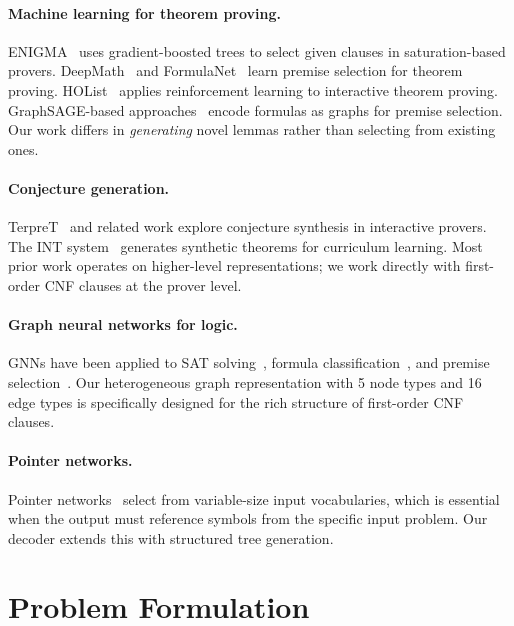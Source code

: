 \documentclass{article}
\begin{document}
\paragraph{Machine learning for theorem proving.}
ENIGMA~\cite{jakubuv2017enigma} uses gradient-boosted trees to select given
clauses in saturation-based provers. DeepMath~\cite{alemi2016deepmath} and
FormulaNet~\cite{wang2017formulanet} learn premise selection for theorem proving.
HOList~\cite{bansal2019holist} applies reinforcement learning to interactive
theorem proving. GraphSAGE-based approaches~\cite{paliwal2020graph} encode
formulas as graphs for premise selection. Our work differs in \emph{generating}
novel lemmas rather than selecting from existing ones.

\paragraph{Conjecture generation.}
TerpreT~\cite{gauthier2021tactictoe} and related work explore conjecture synthesis
in interactive provers. The INT system~\cite{wu2021int} generates synthetic
theorems for curriculum learning. Most prior work operates on higher-level
representations; we work directly with first-order CNF clauses at the prover level.

\paragraph{Graph neural networks for logic.}
GNNs have been applied to SAT solving~\cite{selsam2019learning}, formula
classification~\cite{crouse2019improving}, and premise selection~\cite{paliwal2020graph}.
Our heterogeneous graph representation with 5 node types and 16 edge types is
specifically designed for the rich structure of first-order CNF clauses.

\paragraph{Pointer networks.}
Pointer networks~\cite{vinyals2015pointer} select from variable-size input
vocabularies, which is essential when the output must reference symbols from
the specific input problem. Our decoder extends this with structured tree generation.

\section{Problem Formulation}
\label{sec:problem}
\end{document}
